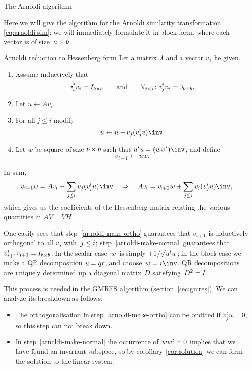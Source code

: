 \documentclass[11pt]{artikel3}
\begin{document}
\begin{Outline}
 {The Arnoldi algorithm}
\label{sec:arnoldi-transform}

Here we will give the algorithm for the Arnoldi similarity 
transformation \eqref{eq:arnoldi-sim}; we will immediately formulate
it in block form, where each vector is of size~$n\times\nobreak b$.
\begin{algorithm}{Arnoldi reduction to Hessenberg form}
Let a matrix $A$ and a vector $v_1$ be given.
\begin{enumerate}
\item Assume inductively that
\[ v_i^tv_i=I_{b\times b}\qquad\hbox{and}\qquad
   \forall_{j<i}\colon v_j^tv_i=0_{b\times b}. \]
\item Let $u\leftarrow Av_i$.
\item\label{arnoldi-make-ortho} For all $j\leq i$ modify
\[ u\leftarrow u-v_j(v_j^tu)\inv. \]
\item\label{arnoldi-make-normal} Let $w$ be square of size $b\times\nobreak b$
such that $u^tu=(ww^t)\inv$, and define \[ v_{i+1}\leftarrow uw. \]
\end{enumerate}
\end{algorithm}

In sum, \[ v_{i+1}w = Av_i-\sum_{j\leq i}v_j(v_j^tu)\inv
\quad\Rightarrow\quad Av_i = v_{i+1}w + \sum_{j\leq i}v_j(v_j^tu)\inv, \]
which gives us the coefficients of the Hessenberg matrix relating the
various quantities in $AV=VH$.

One easily sees that step~\ref{arnoldi-make-ortho} guarantees that $v_{i+1}$
is inductively orthogonal to all $v_j$ with~$j\leq\nobreak i$;
step~\ref{arnoldi-make-normal} guarantees that 
$v_{i+1}^tv_{i+1}=\nobreak I_{b\times b}$.
In the scalar case, $w$~is simply $\pm1/\sqrt{u^tu}$; 
in the block case we make a QR decomposition $u=\nobreak qr$,
and choose~$w=\nobreak r\inv$.
QR decompositions are uniquely determined up a diagonal matrix~$D$
satisfying~$D^2=\nobreak I$.

This process is needed in the GMRES algorithm (section~\ref{sec:gmres}).
We can analyze its breakdown as follows:
\begin{itemize}
\item The orthogonalisation in step~\ref{arnoldi-make-ortho} can be
omitted if $v_j^tu=0$, so this step can not break down.
\item In step~\ref{arnoldi-make-normal} the occurrence of~$ww^t=\nobreak0$
implies that we have found an invariant subspace,
so by corollary~\ref{cor:solution} we can form the solution to the linear
system.
\end{itemize}


\end{Outline}
\end{document}
